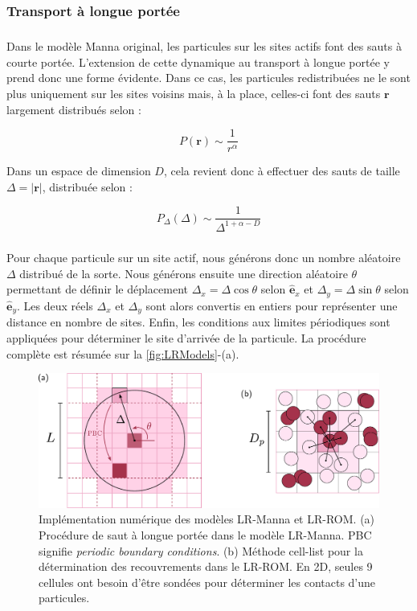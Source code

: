 \subsubsection{Transport à longue portée}

\subparagraph{}Dans le modèle Manna original, les particules sur les sites actifs font des sauts à courte portée. L’extension de cette dynamique au transport à longue portée y prend donc une forme évidente. Dans ce cas, les particules redistribuées ne le sont plus uniquement sur les sites voisins mais, à la place, celles-ci font des sauts $\mathbf{r}$ largement distribués selon :

\begin{equation}
	P(\mathbf{r}) \sim \frac{1}{r^\alpha}
\end{equation}

\noindent Dans un espace de dimension $D$, cela revient donc à effectuer des sauts de taille $\Delta = |\mathbf{r}|$, distribuée selon :

\begin{equation}
	P_\Delta(\Delta) \sim \frac{1}{\Delta^{1+\alpha-D}}
	\label{eq:sauts}
\end{equation}

\subparagraph{}Pour chaque particule sur un site actif, nous générons donc un nombre aléatoire $\Delta$ distribué de la sorte. Nous générons ensuite une direction aléatoire $\theta$ permettant de définir le déplacement $\Delta_x = \Delta \cos \theta$ selon $\hat{\mathbf{e}}_x$ et $\Delta_y = \Delta \sin \theta$ selon $\hat{\mathbf{e}}_y$. Les deux réels $\Delta_x$ et $\Delta_y$ sont alors convertis en entiers pour représenter une distance en nombre de sites. Enfin, les conditions aux limites périodiques sont appliquées pour déterminer le site d'arrivée de la particule. La procédure complète est résumée sur la \autoref{fig:LRModels}-(a).

\begin{figure}[h]
	\centering
	\includegraphics[width=\textwidth]{Chapitre2/Figures/Modeles/MannaJumps.pdf}
	\caption{Implémentation numérique des modèles LR-Manna et LR-ROM. (a) Procédure de saut à longue portée dans le modèle LR-Manna. PBC signifie \textit{periodic boundary conditions}. (b) Méthode cell-list pour la détermination des recouvrements dans le LR-ROM. En 2D, seules 9 cellules ont besoin d'être sondées pour déterminer les contacts d'une particules.}
	\label{fig:LRModels}
\end{figure}

